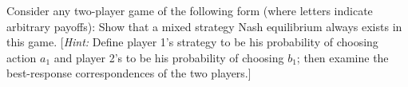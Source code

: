 
Consider any two-player game of the following form (where letters
indicate arbitrary payoffs):
Show that a mixed strategy Nash equilibrium always exists in this game. [\emph{Hint:} Define player
1's strategy to be his probability of choosing action $a_1$ and player 2's to be his probability of
choosing $b_1$; then examine the best-response correspondences of the two players.]
\resolespaco
